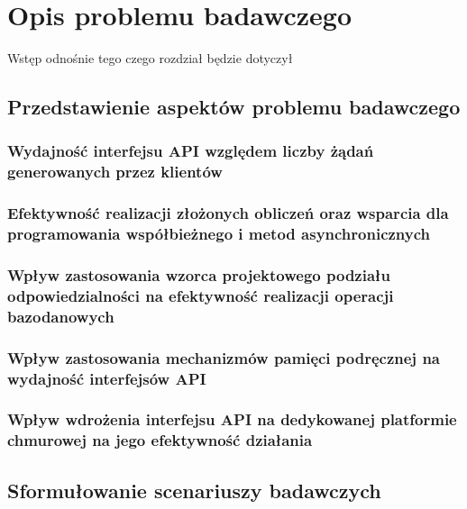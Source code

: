 \chapter{Opis problemu badawczego}
Wstęp odnośnie tego czego rozdział będzie dotyczył
\section{Przedstawienie aspektów problemu badawczego}
\subsection*{Wydajność interfejsu API względem liczby żądań generowanych przez klientów}
\subsection*{Efektywność realizacji złożonych obliczeń oraz wsparcia dla programowania współbieżnego i metod asynchronicznych}
\subsection*{Wpływ zastosowania wzorca projektowego podziału odpowiedzialności na efektywność realizacji operacji bazodanowych}
\subsection*{Wpływ zastosowania mechanizmów pamięci podręcznej na wydajność interfejsów API}
\subsection*{Wpływ wdrożenia interfejsu API na dedykowanej platformie chmurowej na jego efektywność działania}
\section{Sformułowanie scenariuszy badawczych}